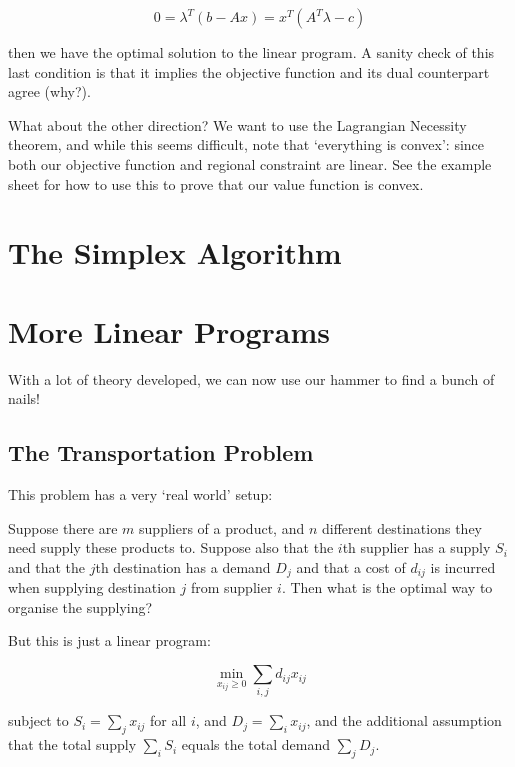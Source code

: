 \documentclass[11pt]{scrartcl}
\begin{document}
\begin{equation}
    0 = \lambda^T(b-Ax) = x^T (A^T\lambda - c)
\label{eqn:comp slack2}
\end{equation}

then we have the optimal solution to the linear program. A sanity check of this last condition is that it implies the objective function and its dual counterpart agree (why?).

What about the other direction? We want to use the Lagrangian Necessity theorem, and while this seems difficult, note that `everything is convex': since both our objective function and regional constraint are linear. See the example sheet for how to use this to prove that our value function is convex.

\section{The Simplex Algorithm}

\section{More Linear Programs}

With a lot of theory developed, we can now use our hammer to find a bunch of nails!

\subsection{The Transportation Problem}

This problem has a very `real world' setup:

\begin{definition}
Suppose there are $m$ suppliers of a product, and $n$ different destinations they need supply these products to. Suppose also that the $i$th supplier has a supply $S_i$ and that the $j$th destination has a demand $D_j$ and that a cost of $d_{ij}$ is incurred when supplying destination $j$ from supplier $i$. Then what is the optimal way to organise the supplying?
\end{definition}

But this is just a linear program:

\begin{equation}
    \min_{x_{ij} \ge 0} \sum_{i, j} d_{ij} x_{ij} 
\end{equation}

subject to $S_i = \sum_j x_{ij}$ for all $i$, and $D_j = \sum_i x_{ij}$, and the additional assumption that the total supply $\sum_i S_i$ equals the total demand $\sum_j D_j$.
\end{document}
